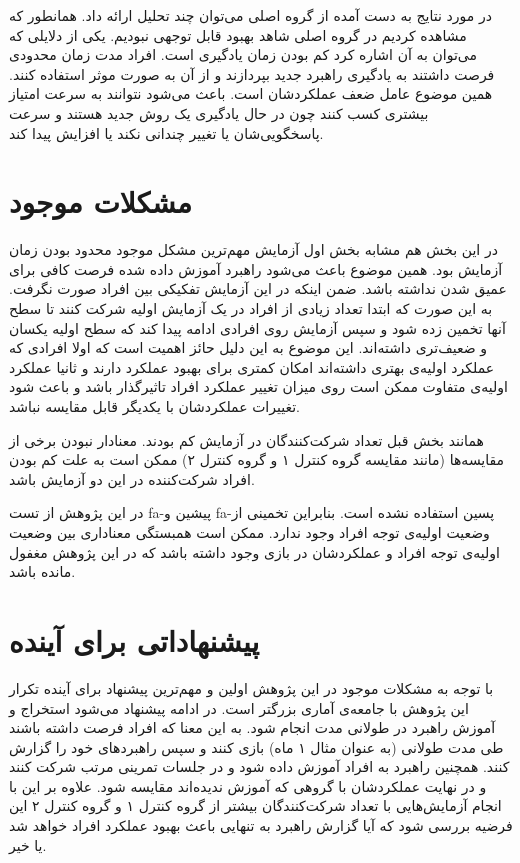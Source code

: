 \documentclass[twoside, a4paper,11pt]{book}
\numberwithin{equation}{chapter}
\numberwithin{table}{chapter}
\numberwithin{figure}{chapter}
\numberwithin{equation}{chapter}
\newcommand{\mls}[1]{\gls{fa-#1}\glsuseri{la-#1}}
\begin{document}
در مورد نتایج به دست آمده از گروه اصلی می‌توان چند تحلیل ارائه داد. همانطور که مشاهده کردیم در گروه اصلی شاهد بهبود قابل توجهی نبودیم. یکی از دلایلی که می‌توان به آن اشاره کرد کم بودن زمان یادگیری است. افراد مدت زمان محدودی فرصت داشتند به یادگیری راهبرد جدید بپردازند و از آن به صورت موثر استفاده کنند. همین موضوع عامل ضعف عملکردشان است. باعث می‌شود نتوانند به سرعت امتیاز بیشتری کسب کنند چون در حال یادگیری یک روش جدید هستند و سرعت پاسخگویی‌شان یا تغییر چندانی نکند یا افزایش پیدا کند. 

\section{مشکلات موجود}

در این بخش هم مشابه بخش اول آزمایش مهم‌ترین مشکل موجود محدود بودن زمان آزمایش بود. همین موضوع باعث می‌شود راهبرد آموزش داده شده فرصت کافی برای عمیق شدن نداشته باشد. ضمن اینکه در این آزمایش تفکیکی بین افراد صورت نگرفت. به این صورت که ابتدا تعداد زیادی از افراد در یک آزمایش اولیه شرکت کنند تا سطح آنها تخمین زده شود و سپس آزمایش روی افرادی ادامه پیدا کند که سطح اولیه یکسان و ضعیف‌تری داشته‌اند. این موضوع به این دلیل حائز اهمیت است که اولا افرادی که عملکرد اولیه‌ی بهتری داشته‌اند امکان کمتری برای بهبود عملکرد دارند و ثانیا عملکرد اولیه‌ی متفاوت ممکن است روی میزان تغییر عملکرد افراد تاثیرگذار باشد و باعث شود تغییرات عملکردشان با یکدیگر قابل مقایسه نباشد.

همانند بخش قبل تعداد شرکت‌کنندگان در آزمایش کم بودند. معنادار نبودن برخی از مقایسه‌ها (مانند مقایسه گروه کنترل ۱ و گروه کنترل ۲) ممکن است به علت کم بودن افراد شرکت‌کننده در این دو آزمایش باشد.

در این پژوهش از تست \mls{پیشین} و \mls{پسین} استفاده نشده است. بنابراین تخمینی از وضعیت اولیه‌ی توجه افراد وجود ندارد. ممکن است همبستگی معناداری بین وضعیت اولیه‌ی توجه افراد و عملکردشان در بازی وجود داشته باشد که در این پژوهش مغفول مانده باشد.

\section{پیشنهاداتی برای آینده}

با توجه به مشکلات موجود در این پژوهش اولین و مهم‌ترین پیشنهاد برای آینده تکرار این پژوهش با جامعه‌ی آماری بزرگتر است. در ادامه پیشنهاد می‌شود استخراج و آموزش راهبرد در طولانی مدت انجام شود. به این معنا که افراد فرصت داشته باشند طی مدت طولانی (به عنوان مثال ۱ ماه) بازی کنند و سپس راهبردهای خود را گزارش کنند. همچنین راهبرد به افراد آموزش داده شود و در جلسات تمرینی مرتب شرکت کنند و در نهایت عملکردشان با گروهی که آموزش ندیده‌اند مقایسه شود. علاوه بر این با انجام آزمایش‌هایی با تعداد شرکت‌کنندگان بیشتر از گروه کنترل ۱ و گروه کنترل ۲ این فرضیه بررسی شود که آیا گزارش راهبرد به تنهایی باعث بهبود عملکرد افراد خواهد شد یا خیر.
\end{document}
